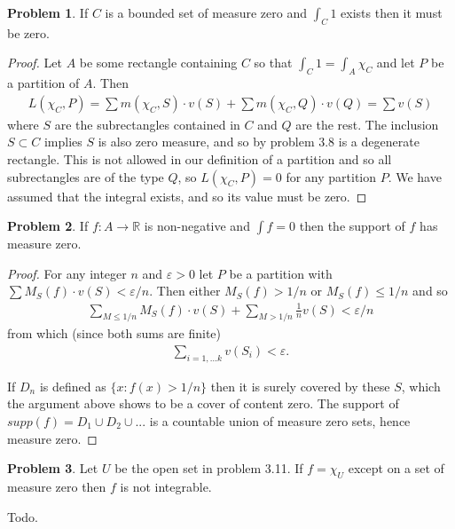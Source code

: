 \documentclass[20pt]{article}
\theoremstyle{plain}
\theoremstyle{definition}
\newtheorem*{problem}{Problem}
\newcommand{\reals}{\mathbb{R}}
\begin{document}
\begin{problem}{3.17}
  If $C$ is a bounded set of measure zero and $\int_C 1$ exists then it must be zero.
\end{problem}

\begin{proof}
  Let $A$ be some rectangle containing $C$ so that $\int_C 1 = \int_A \chi_C$
  and let $P$ be a partition of $A$.  Then 
  \begin{align*}
    L(\chi_C, P) = 
    \sum m(\chi_C, S)\cdot v(S) + \sum m(\chi_C, Q) \cdot v(Q) = 
    \sum v(S)
  \end{align*}
  where $S$ are the subrectangles contained in $C$ and $Q$ are the rest.
  The inclusion $S \subset C$ implies $S$ is also zero measure, and 
  so by problem 3.8 is a degenerate rectangle. This is not allowed in 
  our definition of a partition and so all subrectangles 
  are of the type $Q$, so $L(\chi_C, P) = 0$ for any partition $P$.
  We have assumed that the integral exists, and so its value must be zero.
\end{proof}


\begin{problem}{3.18}
  If $f: A\to\reals$ is non-negative and $\int f = 0$ then the
  support of $f$ has measure zero.
\end{problem}

\begin{proof}
  For any integer $n$ and $\varepsilon > 0$ let $P$ be a partition with 
  $\sum M_S(f)\cdot v(S) < \varepsilon/n.$ 
  Then either $M_S(f) > 1/n$ or $M_S(f) \leq 1/n$ and so 
  \begin{align*}
    \sum_{M\leq 1/n} M_S(f) \cdot v(S) + \sum_{M > 1/n} \frac{1}{n}v(S) < 
    \varepsilon/n
  \end{align*}
  from which (since both sums are finite)
  \begin{align*}
    \sum_{i = 1,...k} v(S_i) < \varepsilon.
  \end{align*}

  If $D_n$ is defined as  $\{ x: f(x) > 1 / n \}$ then it is surely covered by these
  $S$, which the argument above shows to be a cover of content zero.
  The support of $supp(f) = D_1 \cup D_2 \cup ...$ is a countable union of 
  measure zero sets, hence measure zero.
\end{proof}


\begin{problem}{3.19}
  Let $U$ be the open set in problem 3.11.
  If $f = \chi_U$ except on a set of measure zero then $f$ is not integrable.
\end{problem}
\color{Blue}
Todo.
\color{Black}
\end{document}

